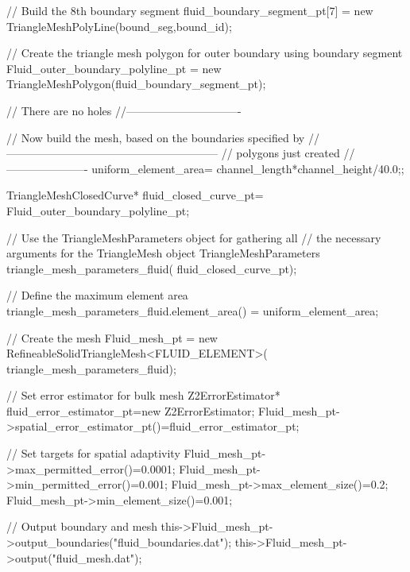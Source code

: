 \begin{DoxyCodeInclude}
 \textcolor{comment}{// Build the 8th boundary segment}
 fluid\_boundary\_segment\_pt[7] = \textcolor{keyword}{new} TriangleMeshPolyLine(bound\_seg,bound\_id);
  
 \textcolor{comment}{// Create the triangle mesh polygon for outer boundary using boundary segment}
 Fluid\_outer\_boundary\_polyline\_pt = 
  \textcolor{keyword}{new} TriangleMeshPolygon(fluid\_boundary\_segment\_pt);

 \textcolor{comment}{// There are no holes}
 \textcolor{comment}{//-------------------------------}
 
 \textcolor{comment}{// Now build the mesh, based on the boundaries specified by}
 \textcolor{comment}{//---------------------------------------------------------}
 \textcolor{comment}{// polygons just created}
 \textcolor{comment}{//----------------------}
 uniform\_element\_area= channel\_length*channel\_height/40.0;;

 TriangleMeshClosedCurve* fluid\_closed\_curve\_pt=
  Fluid\_outer\_boundary\_polyline\_pt;
 
 \textcolor{comment}{// Use the TriangleMeshParameters object for gathering all}
 \textcolor{comment}{// the necessary arguments for the TriangleMesh object}
 TriangleMeshParameters triangle\_mesh\_parameters\_fluid(
   fluid\_closed\_curve\_pt);

 \textcolor{comment}{// Define the maximum element area}
 triangle\_mesh\_parameters\_fluid.element\_area() =
   uniform\_element\_area;

 \textcolor{comment}{// Create the mesh}
 Fluid\_mesh\_pt =
   \textcolor{keyword}{new} RefineableSolidTriangleMesh<FLUID\_ELEMENT>(
     triangle\_mesh\_parameters\_fluid);

 \textcolor{comment}{// Set error estimator for bulk mesh}
 Z2ErrorEstimator* fluid\_error\_estimator\_pt=\textcolor{keyword}{new} Z2ErrorEstimator;
 Fluid\_mesh\_pt->spatial\_error\_estimator\_pt()=fluid\_error\_estimator\_pt;

 \textcolor{comment}{// Set targets for spatial adaptivity}
 Fluid\_mesh\_pt->max\_permitted\_error()=0.0001;
 Fluid\_mesh\_pt->min\_permitted\_error()=0.001; 
 Fluid\_mesh\_pt->max\_element\_size()=0.2;
 Fluid\_mesh\_pt->min\_element\_size()=0.001; 
   
 \textcolor{comment}{// Output boundary and mesh}
 this->Fluid\_mesh\_pt->output\_boundaries(\textcolor{stringliteral}{"fluid\_boundaries.dat"});
 this->Fluid\_mesh\_pt->output(\textcolor{stringliteral}{"fluid\_mesh.dat"});

\end{DoxyCodeInclude}


